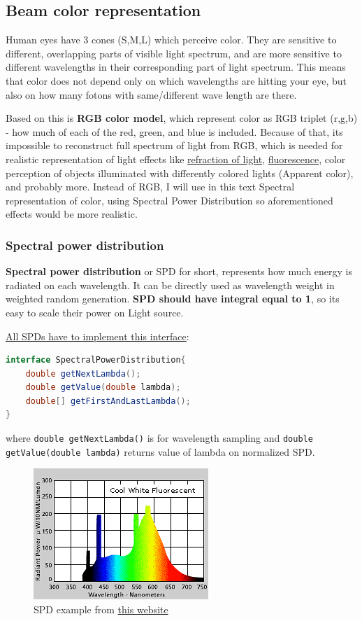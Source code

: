 \documentclass[12pt, letterpaper]{article}
\begin{document}
\subsection{Beam color representation}
Human eyes have 3 cones (S,M,L) which perceive color. They are sensitive to different, overlapping parts of visible light spectrum, and are more sensitive to different wavelengths in their corresponding part of light spectrum. This means that color does not depend only on which wavelengths are hitting your eye, but also on how many fotons with same/different wave length are there.

Based on this is \textbf{RGB color model}, which represent color as RGB triplet (r,g,b) - how much of each of the red, green, and blue is included. Because of that, its impossible to reconstruct full spectrum of light from RGB, which is needed for realistic representation of light effects like \href{https://en.wikipedia.org/wiki/Refraction}{refraction of light}, \href{https://en.wikipedia.org/wiki/Fluorescence}{fluorescence}, color perception of objects illuminated with differently colored lights (Apparent color), and probably more. Instead of RGB, I will use in this text Spectral representation of color, using Spectral Power Distribution so aforementioned effects would be more realistic.

\subsubsection{Spectral power distribution}
\textbf{Spectral power distribution} or SPD for short, represents how much energy is radiated on each wavelength. It can be directly used as wavelength weight in weighted random generation. \textbf{SPD should have integral equal to 1}, so its easy to scale their power on Light source.

\underline{All SPDs have to implement this interface}:
\begin{lstlisting}[language=Java]
interface SpectralPowerDistribution{
	double getNextLambda();
	double getValue(double lambda);
	double[] getFirstAndLastLambda();
}
\end{lstlisting}
where \verb|double getNextLambda()| is for wavelength sampling and \verb|double getValue(double lambda)| returns value of lambda on normalized SPD. 

\begin{figure}[H]%
\centering 
\includegraphics{Spd.png}
\caption{SPD example from \href{http://www.lrc.rpi.edu/education/learning/terminology/spectralpowerdistribution.asp}{this website}}
\end{figure}
\end{document}
